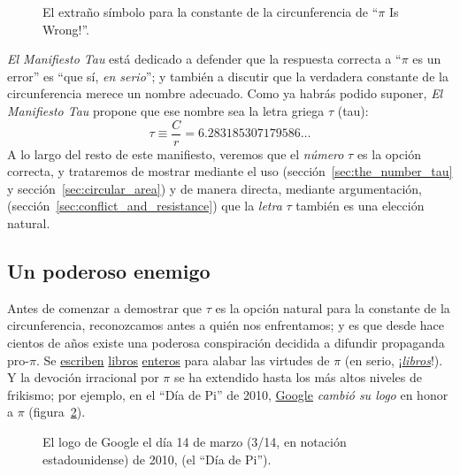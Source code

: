 \begin{figure}
\caption{El extraño símbolo para la constante de la circunferencia de ``$\pi$ Is Wrong!''.\label{fig:palais_tau}}
\end{figure}

\emph{El Manifiesto Tau} está dedicado a defender que la respuesta correcta a ``$\pi$ es un error'' es ``que sí, \emph{en serio}''; y también a discutir que la verdadera constante de la circunferencia merece un nombre adecuado. Como ya habrás podido suponer, \emph{El Manifiesto Tau} propone que ese nombre sea la letra griega $\tau$ (tau):
\begin{equation}
\label{eq:tau}
\tau \equiv \frac{C}{r} = 6.283185307179586\ldots
\end{equation}
A lo largo del resto de este manifiesto, veremos que el \emph{número} $\tau$ es la opción correcta, y trataremos de mostrar mediante el uso (sección~\ref{sec:the_number_tau} y sección~\ref{sec:circular_area}) y de manera directa, mediante argumentación, (sección~\ref{sec:conflict_and_resistance}) que la  \emph{letra} $\tau$ también es una elección natural.

\subsection{Un poderoso enemigo} %
 \label{sec:a_powerful_enemy}

Antes de comenzar a demostrar que $\tau$ es la opción natural para la constante de la circunferencia, reconozcamos antes a quién nos enfrentamos; y es que desde hace cientos de años existe una poderosa conspiración decidida a difundir propaganda pro-$\pi$. Se \href{http://www.amazon.com/exec/obidos/ISBN=0802713327/parallaxproductiA/}{escriben} \href{http://www.amazon.com/Pi-Sky-Counting-Thinking-Being/dp/0198539568}{libros} \href{http://www.amazon.com/exec/obidos/ISBN=0312381859/parallaxproductiA/}{enteros} para alabar las virtudes de $\pi$ (en serio, ¡\href{http://www.amazon.com/exec/obidos/ISBN=0387989463/parallaxproductiA/}{\emph{libros}}!). Y la devoción irracional por  $\pi$ se ha extendido hasta los más altos niveles de frikismo; por ejemplo, en el ``Día de Pi'' de 2010, \href{http://www.google.com/}{Google} \emph{cambió su logo} en honor a $\pi$ (figura~\ref{fig:google_pi_day.}).

\begin{figure}
\begin{center}
\end{center}
\caption{El logo de Google el día 14 de marzo (3/14, en notación estadounidense)
de 2010, (el ``Día de Pi'').\label{fig:google_pi_day.}}
\end{figure}

